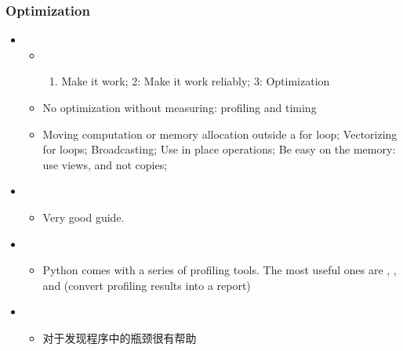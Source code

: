 \documentclass[letterpaper,10pt,english]{sphinxmanual}
\begin{document}
\subsubsection{Optimization}
\label{\detokenize{resource/programing/python_write_your_project:optimization}}\begin{itemize}
\item {} 
\begin{itemize}
\item {} \begin{enumerate}
\def\theenumi{\arabic{enumi}}
\def\labelenumi{\theenumi .}
\makeatletter\def\p@enumii{\p@enumi \theenumi .}\makeatother
\item {} 
Make it work; 2: Make it work reliably; 3: Optimization

\end{enumerate}

\item {} 
No optimization without measuring: profiling and timing

\item {} 
Moving computation or memory allocation outside a for loop;
Vectorizing for loops; Broadcasting; Use in place operations; Be
easy on the memory: use views, and not copies;

\end{itemize}

\item {} 
\begin{itemize}
\item {} 
Very good guide.

\end{itemize}

\item {} 
\begin{itemize}
\item {} 
Python comes with a series of profiling tools. The most useful
ones are , , and  (convert
profiling results into a report)

\end{itemize}

\item {} 
\begin{itemize}
\item {} 
 对于发现程序中的瓶颈很有帮助


\end{itemize}
\end{itemize}
\end{document}
